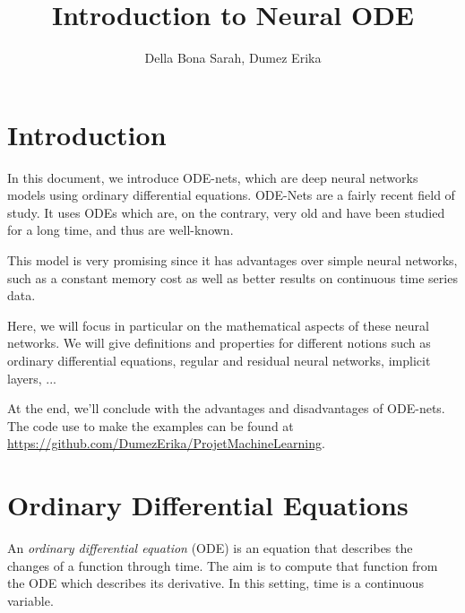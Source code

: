 \documentclass[10pt,a4paper]{article}
\author{Della Bona Sarah, Dumez Erika}
\title{Introduction to Neural ODE}
\theoremstyle{definition}
\theoremstyle{definition}
\theoremstyle{definition}
\begin{document}
\maketitle

\newpage
\tableofcontents

\newpage
\section{Introduction}

In this document, we introduce ODE-nets, which are deep neural networks models using ordinary differential equations. 
ODE-Nets are a fairly recent field of study. It uses ODEs which are, on the contrary, very old and have been studied for a long time, and thus are well-known. 

This model is very promising since it has advantages over simple neural networks, such as a constant memory cost as well as better results on continuous time series data.

Here, we will focus in particular on the mathematical aspects of these neural networks. We will give definitions and properties for different notions such as ordinary differential equations, regular and residual neural networks, implicit layers, ... 

At the end, we'll conclude with the advantages and disadvantages of ODE-nets.
The code use to make the examples can be found at \url{https://github.com/DumezErika/ProjetMachineLearning}.


\section{Ordinary Differential Equations}

An\textit{ ordinary differential equation} (ODE) \cite{9} is an equation that describes the changes of a function through time. The aim is to compute that function from the ODE which describes its derivative. In this setting, time is a continuous variable.
\end{document}
